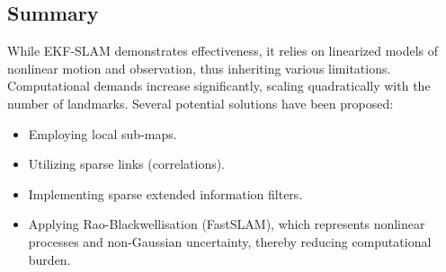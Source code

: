 \subsection{Summary}
While EKF-SLAM demonstrates effectiveness, it relies on linearized models of nonlinear motion and observation, thus inheriting various limitations. 
Computational demands increase significantly, scaling quadratically with the number of landmarks. 
Several potential solutions have been proposed:
\begin{itemize}
    \item Employing local sub-maps. 
    \item Utilizing sparse links (correlations).
    \item Implementing sparse extended information filters.
    \item Applying Rao-Blackwellisation (FastSLAM), which represents nonlinear processes and non-Gaussian uncertainty, thereby reducing computational burden.
\end{itemize}